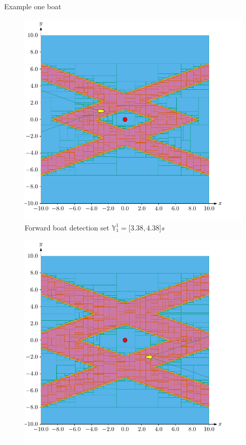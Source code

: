 \documentclass{beamer}
\begin{document}
        \begin{frame}{Example one boat}
            \begin{minipage}{0.45\textwidth}
                \begin{figure}
                        \includegraphics[width=\textwidth]{imgs/forward}
                        \caption{Forward boat detection set $\mathbb{Y}_1^1 = \lbrack3.38, 4.38\rbrack s$}
                \end{figure}
            \end{minipage}
            \hfill
            \begin{minipage}{0.45\textwidth}
                \begin{figure}
                        \includegraphics[width=\textwidth]{imgs/backward}

\end{figure}
\end{minipage}
\end{frame}
\end{document}
